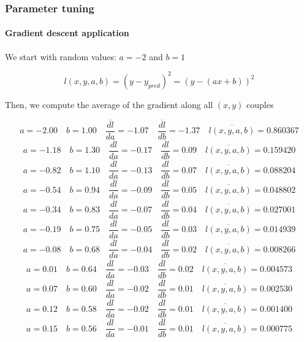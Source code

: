 \documentclass[9pt]{beamer}
\begin{document}
\begin{frame}
  \frametitle{Parameter tuning}

  \framesubtitle{Gradient descent application}

  We start with random values: $a = -2$ and $b = 1$

  \begin{center}
    \scalebox{0.7}{
      
    }
  \end{center}

  \[
  l(x, y, a, b) = (y - y_{pred})^{2} = (y - (a x + b))^{2}
  \]


  Then, we compute the average of the gradient along all $(x, y)$ couples

  \begin{overprint}
     \[ a = -2.00 \quad b = 1.00 \quad \overline{\frac{dl}{da}} = -1.07 \quad \overline{\frac{dl}{db}} = -1.37 \quad \overline{l(x, y, a, b)} = 0.860367 \]
     \[ a = -1.18 \quad b = 1.30 \quad \overline{\frac{dl}{da}} = -0.17 \quad \overline{\frac{dl}{db}} = 0.09 \quad \overline{l(x, y, a, b)} = 0.159420 \]
     \[ a = -0.82 \quad b = 1.10 \quad \overline{\frac{dl}{da}} = -0.13 \quad \overline{\frac{dl}{db}} = 0.07 \quad \overline{l(x, y, a, b)} = 0.088204 \]
     \[ a = -0.54 \quad b = 0.94 \quad \overline{\frac{dl}{da}} = -0.09 \quad \overline{\frac{dl}{db}} = 0.05 \quad \overline{l(x, y, a, b)} = 0.048802 \]
     \[ a = -0.34 \quad b = 0.83 \quad \overline{\frac{dl}{da}} = -0.07 \quad \overline{\frac{dl}{db}} = 0.04 \quad \overline{l(x, y, a, b)} = 0.027001 \]
     \[ a = -0.19 \quad b = 0.75 \quad \overline{\frac{dl}{da}} = -0.05 \quad \overline{\frac{dl}{db}} = 0.03 \quad \overline{l(x, y, a, b)} = 0.014939 \]
     \[ a = -0.08 \quad b = 0.68 \quad \overline{\frac{dl}{da}} = -0.04 \quad \overline{\frac{dl}{db}} = 0.02 \quad \overline{l(x, y, a, b)} = 0.008266 \]
     \[ a = 0.01 \quad b = 0.64 \quad \overline{\frac{dl}{da}} = -0.03 \quad \overline{\frac{dl}{db}} = 0.02 \quad \overline{l(x, y, a, b)} = 0.004573 \]
     \[ a = 0.07 \quad b = 0.60 \quad \overline{\frac{dl}{da}} = -0.02 \quad \overline{\frac{dl}{db}} = 0.01 \quad \overline{l(x, y, a, b)} = 0.002530 \]
     \[ a = 0.12 \quad b = 0.58 \quad \overline{\frac{dl}{da}} = -0.02 \quad \overline{\frac{dl}{db}} = 0.01 \quad \overline{l(x, y, a, b)} = 0.001400 \]
     \[ a = 0.15 \quad b = 0.56 \quad \overline{\frac{dl}{da}} = -0.01 \quad \overline{\frac{dl}{db}} = 0.01 \quad \overline{l(x, y, a, b)} = 0.000775 \]

\end{overprint}
\end{frame}
\end{document}
